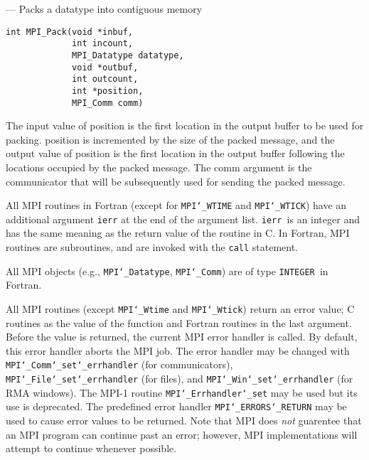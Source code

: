 \startmanpage
{}
--- Packs a datatype into contiguous memory 
\startvb\begin{verbatim}
int MPI_Pack(void *inbuf,
             int incount,
             MPI_Datatype datatype,
             void *outbuf, 
             int outcount,
             int *position,
             MPI_Comm comm)

\end{verbatim}
\endvb

\par
{}
\par
The input value of position is the first location in the output buffer to be
used for packing.  position is incremented by the size of the packed message,
and the output value of position is the first location in the output buffer
following the locations occupied by the packed message.  The comm argument is
the communicator that will be subsequently used for sending the packed
message.
\par
\par
{}
All MPI routines in Fortran (except for {\tt MPI{\tt \char`\_}WTIME} and {\tt MPI{\tt \char`\_}WTICK}) have
an additional argument {\tt ierr} at the end of the argument list.  {\tt ierr
}is an integer and has the same meaning as the return value of the routine
in C.  In Fortran, MPI routines are subroutines, and are invoked with the
{\tt call} statement.
\par
All MPI objects (e.g., {\tt MPI{\tt \char`\_}Datatype}, {\tt MPI{\tt \char`\_}Comm}) are of type {\tt INTEGER
}in Fortran.
\par
{}
\par
All MPI routines (except {\tt MPI{\tt \char`\_}Wtime} and {\tt MPI{\tt \char`\_}Wtick}) return an error value;
C routines as the value of the function and Fortran routines in the last
argument.  Before the value is returned, the current MPI error handler is
called.  By default, this error handler aborts the MPI job.  The error handler
may be changed with {\tt MPI{\tt \char`\_}Comm{\tt \char`\_}set{\tt \char`\_}errhandler} (for communicators),
{\tt MPI{\tt \char`\_}File{\tt \char`\_}set{\tt \char`\_}errhandler} (for files), and {\tt MPI{\tt \char`\_}Win{\tt \char`\_}set{\tt \char`\_}errhandler} (for
RMA windows).  The MPI-1 routine {\tt MPI{\tt \char`\_}Errhandler{\tt \char`\_}set} may be used but
its use is deprecated.  The predefined error handler
{\tt MPI{\tt \char`\_}ERRORS{\tt \char`\_}RETURN} may be used to cause error values to be returned.
Note that MPI does {\em not} guarentee that an MPI program can continue past
an error; however, MPI implementations will attempt to continue whenever
possible.
\par
{}
\endmanpage
